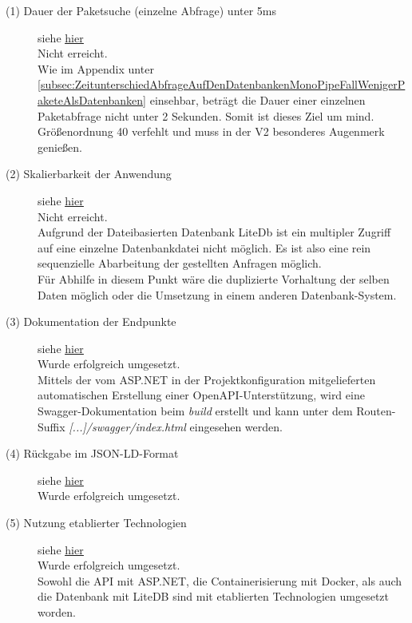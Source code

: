     \begin{description}
        \item[(1) Dauer der Paketsuche (einzelne Abfrage) unter 5ms] siehe \hyperref[nf:one]{\underline{hier}} \hfill \\
            Nicht erreicht.
            \\
            Wie im Appendix unter \ref{subsec:ZeitunterschiedAbfrageAufDenDatenbankenMonoPipeFallWenigerPaketeAlsDatenbanken} einsehbar, beträgt die Dauer einer einzelnen Paketabfrage nicht unter 2 Sekunden.
            Somit ist dieses Ziel um mind. Größenordnung 40 verfehlt und muss in der V2 besonderes Augenmerk genießen.
        \item[(2) Skalierbarkeit der Anwendung] siehe \hyperref[nf:two]{\underline{hier}} \hfill \\
            Nicht erreicht.
            \\
            Aufgrund der Dateibasierten Datenbank LiteDb ist ein multipler Zugriff auf eine einzelne Datenbankdatei nicht möglich. Es ist also eine rein sequenzielle Abarbeitung der gestellten Anfragen möglich.
            \\
            Für Abhilfe in diesem Punkt wäre die duplizierte Vorhaltung der selben Daten möglich oder die Umsetzung in einem anderen Datenbank-System.
        \item[(3) Dokumentation der Endpunkte] siehe \hyperref[nf:three]{\underline{hier}} \hfill \\
            Wurde erfolgreich umgesetzt.
            \\
            Mittels der vom ASP.NET in der Projektkonfiguration mitgelieferten automatischen Erstellung einer OpenAPI-Unterstützung, wird eine Swagger-Dokumentation beim \textit{build} erstellt und kann unter dem Routen-Suffix \textit{[...]/swagger/index.html} eingesehen werden.
        \item[(4) Rückgabe im \acs{JSON-LD}-Format] siehe \hyperref[nf:four]{\underline{hier}} \hfill \\
            Wurde erfolgreich umgesetzt.
        \item[(5) Nutzung etablierter Technologien] siehe \hyperref[nf:five]{\underline{hier}} \hfill \\
            Wurde erfolgreich umgesetzt.
            \\
            Sowohl die \ac{API} mit ASP.NET, die Containerisierung mit Docker, als auch die Datenbank mit LiteDB sind mit etablierten Technologien umgesetzt worden.
    \end{description}

